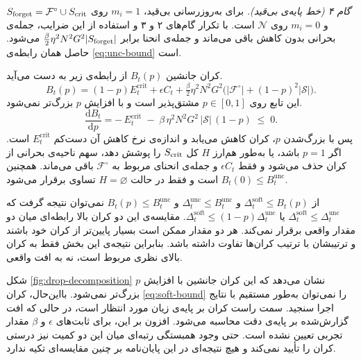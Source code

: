 \begin{trivlist}
	\textit{گام ۴ (خط پایه‌ی بی‌قید).} برای به‌روزرسانی بی‌قید، $m_i=1$ روی $S_{\mathrm{forget}}=\mathcal{F}^{\circ}\cup S_{\mathrm{crit}}$ و $m_i=0$ روی $\mathcal{N}$ است. با تکرار گام‌های ۲ و ۳ و استفاده از این ضرایب، جمله‌ی بحرانی بدون کاهش باقی می‌ماند و جمله‌ی انحنا برابر $\tfrac{\beta}{2}\eta^2N^2G^2|S_{\mathrm{forget}}|$ می‌شود. حاصل همان رابطه‌ی \eqref{eq:unc-bound} است.

\end{trivlist}

\begin{corollary}
	\label{cor:monotone}
	کران جانشین $B_t(p)$ از رابطه‌ی زیر به دست می‌آید.
	\begin{equation*}
		B_t(p)=(1-p)E^{\mathrm{crit}}_t+\epsilon C_t
		+\tfrac{\beta}{2}\eta^2N^2G^2\bigl(|\mathcal{F}^{\circ}|+(1-p)^2|\mathcal{S}|\bigr).
	\end{equation*}
	این تابع روی $p\in[0,1]$ مشتق‌پذیر است و با افزایش $p$ بزرگ‌تر نمی‌شود.
	\begin{equation}
		\label{eq:dBdp}
		\frac{\mathrm{d}B_t}{\mathrm{d}p} = -\,E^{\mathrm{crit}}_t \;-\; \beta\,\eta^2N^2G^2\,|\mathcal{S}|\,(1-p) \;\leq\; 0 .
	\end{equation}
	پس با بزرگ‌شدن $p$، کران کاهش می‌یابد و اندازه‌ی نرخ کاهش آن دست‌کم $E^{\mathrm{crit}}_t$ است. اگر $p=1$ باشد، یا به‌طور هم‌ارز $H$ کل $S_{\mathrm{crit}}$ را پوشش دهد، سهم ناحیه‌ی بحرانی از کران حذف می‌شود و فقط $\epsilon C_t$ و جمله‌ی انحنای مربوط به $\mathcal{F}^{\circ}$ باقی می‌ماند. همچنین $B_t(0)\leq B^{\mathrm{unc}}_t$ است و فقط در حالت $H=\varnothing$ تساوی برقرار می‌شود.
\end{corollary}

\begin{observation}
	\label{obs:no-contraction}
	از $\Delta^{\mathrm{soft}}_t\leq B_t(p)$ و $\Delta^{\mathrm{unc}}_t\leq B^{\mathrm{unc}}_t$ و $B_t(p)\leq B^{\mathrm{unc}}_t$ نمی‌توان نتیجه گرفت که $\Delta^{\mathrm{soft}}_t\leq\Delta^{\mathrm{unc}}_t$ یا $\Delta^{\mathrm{soft}}_t\leq(1-p)\Delta^{\mathrm{unc}}_t$. مقایسه‌ی این دو کران بالا رابطه‌ای میان دو مقدار واقعی برقرار نمی‌کند. هر دو مقدار ممکن است بسیار پایین‌تر از کران خود باشند و ترتیبشان با ترتیب کران‌ها تفاوت داشته باشد. بنابراین نتیجه‌ی این بخش فقط به کران بالای نظری مربوط است، نه به افت واقعی.
\end{observation}

شکل \ref{fig:drop-decomposition} نشان می‌دهد که این کران جانشین با افزایش $p$ بزرگ‌تر نمی‌شود. بااین‌حال، کران \eqref{eq:soft-bound} را نمی‌توان به‌طور مستقیم با نتایج اجرا سنجید. سمت راست کران بر پایه‌ی زیان مورد انتظار است، در حالی که افت گزارش‌شده بر پایه‌ی دقت محاسبه می‌شود. افزون بر این، برای ثابت‌های $\epsilon$ و $\beta$ مقدار تجربی تعیین نشده است. حتی وجود همبستگی رتبه‌ای میان این دو کمیت نیز درستی کران را تأیید نمی‌کند و هیچ نتیجه‌ای در این پایان‌نامه بر چنین مقایسه‌ای تکیه ندارد.


